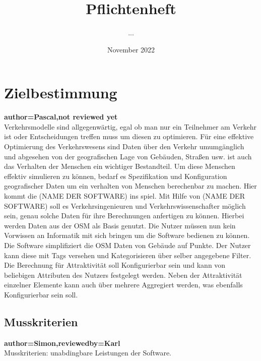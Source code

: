 \documentclass[parskip=full]{scrartcl} %
\title{Pflichtenheft}
\author{...}
\date{November 2022}
\begin{document}
\maketitle
\newpage

\tableofcontents
\newpage




\section{Zielbestimmung}

\textbf{author=Pascal,not reviewed yet\\}
Verkehrsmodelle sind allgegenwärtig, egal ob man nur ein Teilnehmer am Verkehr ist oder Entscheidungen treffen muss um diesen zu optimieren.
Für eine effektive Optimierung des Verkehrswesens sind Daten über den Verkehr umumgänglich und abgesehen von der geografischen Lage von Gebäuden, Straßen usw. ist auch das Verhalten der Menschen ein wichtiger Bestandteil.
Um diese Menschen effektiv simulieren zu können, bedarf es Spezifikation und Konfiguration geografischer Daten um ein verhalten von Menschen berechenbar zu machen.
Hier kommt die (NAME DER SOFTWARE) ins spiel.
Mit Hilfe von (NAME DER SOFTWARE) soll es  Verkehrsingenieuren und Verkehrswissenschafter möglich sein, genau solche Daten für ihre Berechnungen anfertigen zu können.
Hierbei werden Daten aus der OSM als Basis genutzt.
Die Nutzer müssen nun kein Vorwissen an Informatik mit sich bringen um die Software bedienen zu können.
Die Software simplifiziert die OSM Daten von Gebäude auf Punkte. Der Nutzer kann diese mit Tags versehen und Kategorisieren über selber angegebene Filter.
Die Berechnung für Attraktivität soll Konfigurierbar sein und kann von beliebigen Attributen des Nutzers festgelegt werden.
Neben der Attraktivität einzelner Elemente kann auch über mehrere Aggregiert werden, was ebenfalls Konfigurierbar sein soll.

\subsection{Musskriterien}
\textbf{author=Simon,reviewedby=Karl\\}
Musskriterien: unabdingbare Leistungen der Software.
\end{document}
